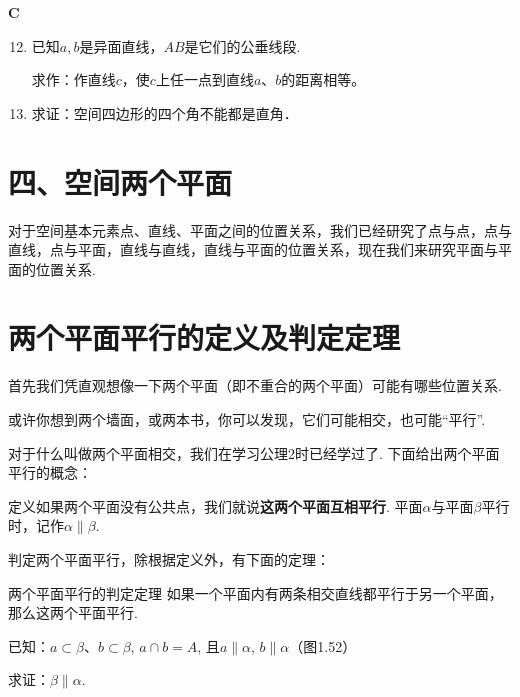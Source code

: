 \begin{center}
    \bfseries C
\end{center}

\begin{enumerate}\setcounter{enumi}{11}
\item 已知$a,b$是异面直线，$AB$是它们的公垂线段.

求作：作直线$c$，使$c$上任一点到直线$a$、$b$的距离相等。
\item 求证：空间四边形的四个角不能都是直角．
\end{enumerate}





\section*{四、空间两个平面}
对于空间基本元素点、直线、平面之间的位置关系，我们已经研究了点与点，点与直线，点与平面，直线与直线，直线与平面的位置关系，现在我们来研究平面与平面的位置关系.

\section{两个平面平行的定义及判定定理}
首先我们凭直观想像一下两个平面（即不重合的两个平面）可能有哪些位置关系.

或许你想到两个墙面，或两本书，你可以发现，它们可能相交，也可能“平行”.

对于什么叫做两个平面相交，我们在学习公理2时已经学过了. 下面给出两个平面平行的概念：

\begin{thm}
 {定义}如果两个平面没有公共点，我们就说\textbf{这两个平面互相平行}. 平面$\alpha$与平面$\beta$平行时，记作$\alpha\parallel \beta$.   
\end{thm}

判定两个平面平行，除根据定义外，有下面的定理：

\begin{thm}
  {两个平面平行的判定定理} 如果一个平面内有两条相交直线都平行于另一个平面，那么这两个平面平行.  
\end{thm}

已知：$a\subset \beta$、$b\subset \beta$, $a\cap b=A$, 且$a\parallel \alpha$, $b\parallel \alpha$（图1.52）

求证：$\beta\parallel  \alpha$.

